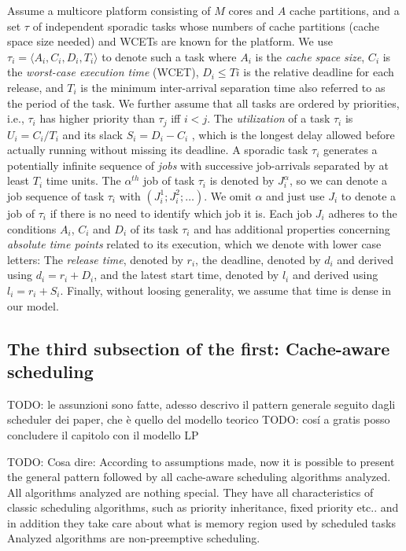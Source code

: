 \documentclass[a4paper,10pt]{article}
\begin{document}
\begin{multicols}{2}
Assume a multicore platform consisting of $M$ cores and $A$ cache partitions, and a set $\tau$ of independent sporadic tasks
whose numbers of cache partitions (cache space size needed) and WCETs are known for the platform. We use $\tau_i = \langle A_i,C_i,D_i,T_i \rangle$
to denote such a task where $A_i$ is the \textit{cache space size}, $C_i$ is the \textit{worst-case execution time} (WCET), $D_i \le Ti$ is the 
relative deadline for each release, and $T_i$ is the minimum inter-arrival separation time also referred to as the period of the task. We further assume
that all tasks are ordered by priorities, i.e., $\tau_i$ has higher priority than $\tau_j$ iff $i < j$. The \textit{utilization} of a task $\tau_i$ is
$U_i = C_i/T_i$ and its slack $S_i = D_i - C_i$ , which is the longest delay allowed before actually running without missing its
deadline. A sporadic task $\tau_i$ generates a potentially infinite sequence of \textit{jobs} with successive job-arrivals separated by at least $T_i$
time units. The $\alpha^{th}$ job of task $\tau_i$ is denoted by $J_{i}^\alpha$, so we can denote a job sequence of task $\tau_i$
with $(J_{i}^1; J_{i}^2;\dots{})$. We omit $\alpha$ and just use $J_i$ to denote a job of $\tau_i$ if there is no need to identify which job it is. Each
job $J_i$ adheres to the conditions $A_i$, $C_i$ and $D_i$ of its task $\tau_i$ and has additional properties concerning \textit{absolute time points} 
related to its execution, which we denote with lower case letters: The \textit{release time}, denoted by $r_i$, the deadline, denoted by $d_i$
and derived using $d_i = r_i + D_i$, and the latest start time, denoted by $l_i$ and derived using $l_i = r_i + S_i$.
Finally, without loosing generality, we assume that time is dense in our model.

\subsection{The third subsection of the first: Cache-aware scheduling}

TODO: le assunzioni sono fatte, adesso descrivo il pattern generale seguito dagli scheduler dei paper, che è quello del modello teorico
TODO: cos\'i a gratis posso concludere il capitolo con il modello LP

TODO: Cosa dire: 
According to assumptions made, now it is possible to present the general pattern followed by all cache-aware scheduling algorithms analyzed.
All algorithms analyzed are nothing special. They have all characteristics of classic scheduling algorithms, such as priority inheritance, 
fixed priority etc.. and in addition they take care about what is memory region used by scheduled tasks
Analyzed algorithms are non-preemptive scheduling.


\end{multicols}
\end{document}
